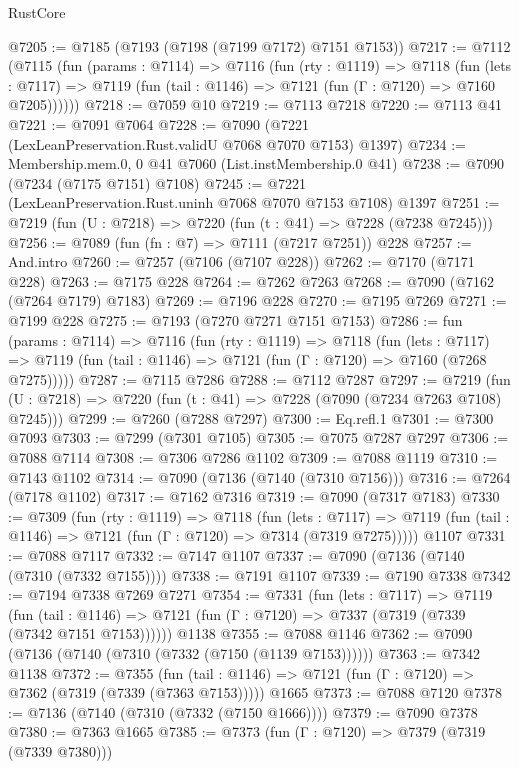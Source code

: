 \begin{lexlean}{RustCore}
\begin{coremodule}
@7205 := @7185 (@7193 (@7198 (@7199 @7172) @7151 @7153))
@7217 := @7112
    (@7115
      (fun (params : @7114) =>
      @7116
        (fun (rty : @1119) =>
        @7118
          (fun (lets : @7117) =>
          @7119 (fun (tail : @1146) => @7121 (fun (Γ : @7120) => @7160 @7205))))))
@7218 := @7059 @10
@7219 := @7113 @7218
@7220 := @7113 @41
@7221 := @7091 @7064
@7228 := @7090 (@7221 (LexLeanPreservation.Rust.validU @7068 @7070 @7153) @1397)
@7234 := Membership.mem.{0, 0} @41 @7060 (List.instMembership.{0} @41)
@7238 := @7090 (@7234 (@7175 @7151) @7108)
@7245 := @7221 (LexLeanPreservation.Rust.uninh @7068 @7070 @7153 @7108) @1397
@7251 := @7219 (fun (U : @7218) => @7220 (fun (t : @41) => @7228 (@7238 @7245)))
@7256 := @7089 (fun (fn : @7) => @7111 (@7217 @7251)) @228
@7257 := And.intro
@7260 := @7257 (@7106 (@7107 @228))
@7262 := @7170 (@7171 @228)
@7263 := @7175 @228
@7264 := @7262 @7263
@7268 := @7090 (@7162 (@7264 @7179) @7183)
@7269 := @7196 @228
@7270 := @7195 @7269
@7271 := @7199 @228
@7275 := @7193 (@7270 @7271 @7151 @7153)
@7286 := fun (params : @7114) =>
  @7116
    (fun (rty : @1119) =>
    @7118
      (fun (lets : @7117) =>
      @7119 (fun (tail : @1146) => @7121 (fun (Γ : @7120) => @7160 (@7268 @7275)))))
@7287 := @7115 @7286
@7288 := @7112 @7287
@7297 := @7219 (fun (U : @7218) => @7220 (fun (t : @41) => @7228 (@7090 (@7234 @7263 @7108) @7245)))
@7299 := @7260 (@7288 @7297)
@7300 := Eq.refl.{1}
@7301 := @7300 @7093
@7303 := @7299 (@7301 @7105)
@7305 := @7075 @7287 @7297
@7306 := @7088 @7114
@7308 := @7306 @7286 @1102
@7309 := @7088 @1119
@7310 := @7143 @1102
@7314 := @7090 (@7136 (@7140 (@7310 @7156)))
@7316 := @7264 (@7178 @1102)
@7317 := @7162 @7316
@7319 := @7090 (@7317 @7183)
@7330 := @7309
    (fun (rty : @1119) =>
    @7118
      (fun (lets : @7117) =>
      @7119 (fun (tail : @1146) => @7121 (fun (Γ : @7120) => @7314 (@7319 @7275)))))
    @1107
@7331 := @7088 @7117
@7332 := @7147 @1107
@7337 := @7090 (@7136 (@7140 (@7310 (@7332 @7155))))
@7338 := @7191 @1107
@7339 := @7190 @7338
@7342 := @7194 @7338 @7269 @7271
@7354 := @7331
    (fun (lets : @7117) =>
    @7119
      (fun (tail : @1146) => @7121 (fun (Γ : @7120) => @7337 (@7319 (@7339 (@7342 @7151 @7153))))))
    @1138
@7355 := @7088 @1146
@7362 := @7090 (@7136 (@7140 (@7310 (@7332 (@7150 (@1139 @7153))))))
@7363 := @7342 @1138
@7372 := @7355
    (fun (tail : @1146) => @7121 (fun (Γ : @7120) => @7362 (@7319 (@7339 (@7363 @7153)))))
    @1665
@7373 := @7088 @7120
@7378 := @7136 (@7140 (@7310 (@7332 (@7150 @1666))))
@7379 := @7090 @7378
@7380 := @7363 @1665
@7385 := @7373 (fun (Γ : @7120) => @7379 (@7319 (@7339 @7380)))

\end{coremodule}
\end{lexlean}

